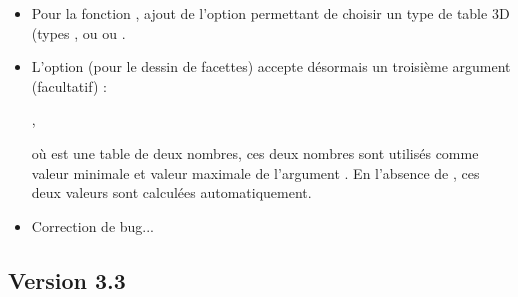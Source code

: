 \begin{itemize}
    \item Pour la fonction , ajout de l'option  permettant de choisir un type de table 3D (types , ou  ou .

    \item L'option  (pour le  dessin de facettes) accepte désormais un troisième argument (facultatif) : \par
    \hfil{},\hfil\par
    où  est une table de deux nombres, ces deux nombres sont utilisés comme valeur minimale et valeur maximale de l'argument . En l'absence de , ces deux valeurs sont calculées automatiquement.
    
    \item Correction de bug...
\end{itemize}


\subsection{Version 3.3}

